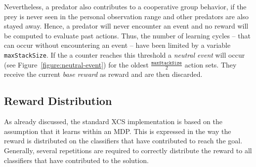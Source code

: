 Nevertheless, a predator also contributes to a cooperative group behavior, if the prey is never seen in the personal observation range and other predators are also stayed away. Hence, a predator will never encounter an event and no reward will be computed to evaluate past actions. Thus, the number of learning cycles -- that can occur without encountering an event -- have been limited by a variable \verb|maxStackSize|. If the a counter reaches this threshold a \emph{neutral event} will occur (see Figure~\ref{figure:neutral-event}) for the oldest $\frac{\texttt{maxStackSize}}{2}$ action sets. They receive the current \emph{base reward} as reward and are then discarded.



\subsection{Reward Distribution}
\label{subsection:reward-distribution}

As already discussed, the standard XCS implementation is based on the assumption that it learns within an MDP. This is expressed in the way the reward is distributed on the classifiers that have contributed to reach the goal. Generally, several repetitions are required to correctly distribute the reward to all classifiers that have contributed to the solution.

